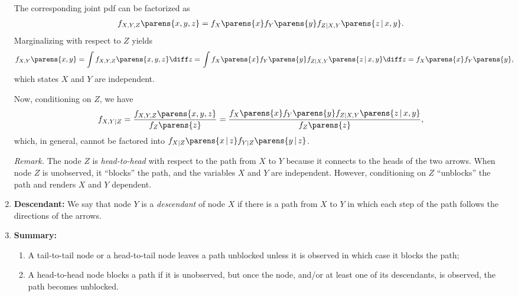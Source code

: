 \documentclass[12pt]{article}
\begin{document}
\begin{enumerate}[label=\textbf{\arabic*.}]
	The corresponding joint pdf can be factorized as 
	\begin{align*}
		f_{X, Y, Z} \parens{x, y, z} = f_{X} \parens{x} f_{Y} \parens{y} f_{Z \vert X, Y} \parens{z \,\vert\, x, y}. 
	\end{align*}
	Marginalizing with respect to $Z$ yields 
	\begin{align*}
		f_{X, Y} \parens{x, y} = \int f_{X, Y, Z} \parens{x, y, z} \diff z = & \, \int f_{X} \parens{x} f_{Y} \parens{y} f_{Z \vert X, Y} \parens{z \,\vert\, x, y} \diff z = f_{X} \parens{x} f_{Y} \parens{y}, 
	\end{align*}
	which states $X$ and $Y$ are independent. 
	
	Now, conditioning on $Z$, we have 
	\begin{align*}
		f_{X, Y \vert Z} = \frac{f_{X, Y, Z} \parens{x, y, z}}{f_{Z} \parens{z}} = \frac{f_{X} \parens{x} f_{Y} \parens{y} f_{Z \vert X, Y} \parens{z \,\vert\, x, y}}{f_Z \parens{z}}, 
	\end{align*}
	which, in general, cannot be factored into $f_{X \vert Z} \parens{x \,\vert\, z} f_{Y \vert Z} \parens{y \,\vert\, z}$. 
	
	\textit{Remark.} The node $Z$ is \emph{head-to-head} with respect to the path from $X$ to $Y$ because it connects to the heads of the two arrows. When node $Z$ is unobserved, it ``blocks'' the path, and the variables $X$ and $Y$ are independent. However, conditioning on $Z$ ``unblocks'' the path and renders $X$ and $Y$ dependent. 
	
	\item \textbf{Descendant:} We say that node $Y$ is a \emph{descendant} of node $X$ if there is a path from $X$ to $Y$ in which each step of the path follows the directions of the arrows. 
		
	\item \textbf{Summary:} 
	\begin{enumerate}
		\item A tail-to-tail node or a head-to-tail node leaves a path unblocked unless it is observed in which case it blocks the path; 
		\item A head-to-head node blocks a path if it is unobserved, but once the node, and/or at least one of its descendants, is observed, the path becomes unblocked. 
	\end{enumerate}
	

\end{enumerate}
\end{document}
